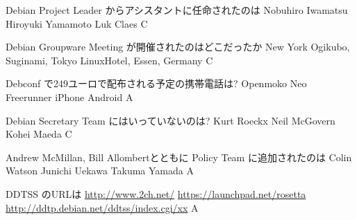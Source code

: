 %
%

\santaku
{Debian Project Leader からアシスタントに任命されたのは}
{Nobuhiro Iwamatsu}
{Hiroyuki Yamamoto}
{Luk Claes}
{C}
{}

\santaku
{Debian Groupware Meeting が開催されたのはどこだったか}
{New York}
{Ogikubo, Suginami, Tokyo}
{LinuxHotel, Essen, Germany}
{C}
{}

\santaku
{Debconf で249ユーロで配布される予定の携帯電話は?}
{Openmoko Neo Freerunner}
{iPhone}
{Android}
{A}
{}

\santaku
{Debian Secretary Team にはいっていないのは?}
{Kurt Roeckx}
{Neil McGovern}
{Kohei Maeda}
{C}
{}

\santaku
{Andrew McMillan, Bill Allombertとともに Policy Team に追加されたのは}
{Colin Watson}
{Junichi Uekawa}
{Takuma Yamada}
{A}
{}

\santaku
{DDTSS のURLは}
{\url{http://www.2ch.net/}}
{\url{https://launchpad.net/rosetta}}
{\url{http://ddtp.debian.net/ddtss/index.cgi/xx}}
{A}
{}
